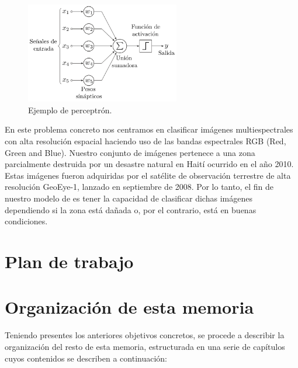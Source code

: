 \begin{figure}[H]
    \centering
    \includegraphics[width=0.6\textwidth]{images/chapter1/perceptron.png}
    \caption{Ejemplo de perceptrón.}
    \label{fig:Perceptrón}
\end{figure}

En este problema concreto nos centramos en clasificar imágenes multiespectrales con alta resolución espacial haciendo uso de las bandas espectrales RGB (Red, Green and Blue).
Nuestro conjunto de imágenes pertenece a una zona parcialmente destruida por un desastre natural en Haití ocurrido en el año 2010.
Estas imágenes fueron adquiridas por el satélite de observación terrestre de alta resolución GeoEye-1, lanzado en septiembre de 2008.
Por lo tanto, el fin de nuestro modelo de  es tener la capacidad de clasificar dichas imágenes dependiendo si la zona está dañada o, por el contrario, está en buenas condiciones.

\section{Plan de trabajo}\label{sec:plan-de-trabajo}


\section{Organización de esta memoria}\label{sec:organización-de-esta-memoria}

Teniendo presentes los anteriores objetivos concretos, se procede a describir la organización del resto de esta memoria, estructurada en una serie de capítulos cuyos contenidos se
describen a continuación:

